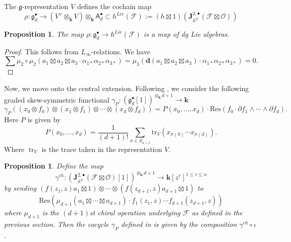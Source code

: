 \documentclass[11pt]{amsart}
\newtheorem{prop}[thm]{Proposition}
\theoremstyle{definition}
\theoremstyle{remark}
\numberwithin{equation}{section}
\newcommand{\op}{\operatorname}
\begin{document}
The $\mathfrak{g}$-representation $V$ defines the cochain map
$$
\rho \colon \mathfrak{g}_d^{\bullet}\rightarrow (V^{\vee}\otimes_{\mathbf{k}} V)\otimes_{\mathbf{k}} \mathsf{A}
_d^{\bullet}\subset h^{Lie}(\mathcal{F}):=(h\boxtimes 1)\left(\mathbf{J}^{2,\bullet}_{\mathbb{A}^d}(\mathcal{F}\boxtimes \mathcal{O})\right)
$$


\begin{prop}
    The map $\rho \colon \mathfrak{g}^{\bullet}_d\rightarrow h^{Lie}(\mathcal{F})$ is a map of dg Lie algebras.
\end{prop}
\begin{proof}
    This follows from $L_\infty$-relations. We have
    $$
    \sum \mu_2\circ \mu_2\left(a_1\boxtimes a_2\boxtimes a_3\cdot \alpha_{1\ast}\alpha_{2\ast}\alpha_{3\ast}\right)=\mu_3\left(\mathbf{d}(a_1\boxtimes a_2\boxtimes a_3)\cdot \alpha_{1\ast}\alpha_{2\ast}\alpha_{3\ast}\right)=0.
    $$
\end{proof}

Now, we move onto the central extension.
Following \cite{FHK}, we consider the following graded skew-symmetric functional $\gamma_P:\left(\mathfrak{g}_d^{\bullet}[1]\right)^{\otimes_{\mathbf{k}}d+1}\rightarrow \mathbf{k}$
$$
\gamma_P\left((x_0\otimes f_0)\otimes(x_1\otimes f_1)\otimes \cdots \otimes (x_d\otimes f_d) \right)=P(x_0,\dots,x_d)\cdot \mathrm{Res}\left(f_0\cdot \partial f_1\wedge\cdots \wedge \partial f_d\right).
$$
Here $P$ is given by
$$
P(x_0,\dots,x_{d})=\frac{1}{(d+1)!}\sum_{\sigma\in S_{n+1}}\mathrm{tr}_V\left(x_{\sigma(0)}\cdots x_{\sigma(d)}\right).
$$
Where $\op{tr}_V$ is the trace taken in the representation $V$.

\begin{prop}
    Define the map
    $$
\gamma^{ch}:\left(\mathbf{J}^{2,\bullet}_{\mathbb{A}^d}(\mathcal{F}\boxtimes \mathcal{O})[1]\right)^{\otimes_{\mathbf{k}} d+1}\rightarrow \mathbf{k}[z^r]^{1\leq r\leq n}
    $$
    by sending $\left(f(z_1,z)a_1\boxtimes 1\right)\otimes\cdots \otimes \left(f(z_{d+1},z)a_{d+1}\boxtimes 1\right) $ to    $$\mathrm{Res}\left(\mu_{d+1}(a_1\boxtimes\cdots \boxtimes a_{d+1})\cdot f_1(z_1,z)\cdots f_{d+1}(z_{d+1},z)\right)
    $$
    where $\mu_{d+1}$ is the $(d+1)$st chiral operation underlying $\mathcal{F}$ as defined in the previous section.
    Then the cocycle $\gamma_P$ defined in \cite{FHK} is given by the composition $\gamma^{ch}\circ\iota$.
\end{prop}
\end{document}
